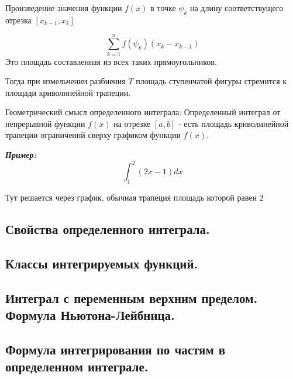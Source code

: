 \documentclass[a4paper,12pt]{article}
\theoremstyle{plain} %
\theoremstyle{definition} %
\theoremstyle{remark} %
\begin{document}
Произведение значения функции $f(x)$ в точке $\psi_k$ на длину соответствущего отрезка $[x_{k-1}, x_k]$

	\[
		\sum_{k = 1}^n f(\psi_k)(x_k - x_{k-1})
	\]
	Это площадь составленная из всех таких прямоугольников.

	Тогда при измельчении разбиения $T$ площадь ступенчатой фигуры стремится к площади криволинейной трапеции.

	Геометрический смысл определенного интеграла:
	Определенный интеграл от непрерывной функции $f(x)$ на отрезке $[a, b]$ - есть площадь криволинейной трапеции ограниченнй сверху графиком функции $f(x)$.

\textit{\textbf{Пример:}}
\[
	\int_1^2 (2x - 1) dx
\]

Тут решается через график, обычная трапеция площадь которой равен 2

\newpage
\subsection*{Свойства определенного интеграла.                                                            }

\newpage
\subsection*{Классы интегрируемых функций.                                                                }

\newpage
\subsection*{Интеграл с переменным верхним пределом. Формула Ньютона-Лейбница.                            }

\newpage
\subsection*{Формула интегрирования по частям в определенном интеграле.                                   }
\end{document}
